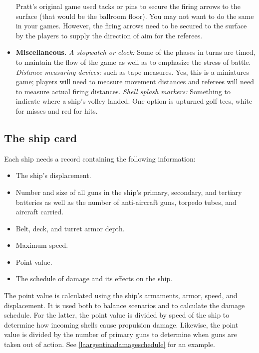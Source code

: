\documentclass[twocolumn]{article}
\begin{document}
\begin{itemize}
  Pratt's original game used tacks or pins to secure the firing arrows
  to the surface (that would be the ballroom floor). You may not want to
  do the same in your games. However, the firing arrows need to be secured to the
  surface by the players to supply the direction of aim for the referees.
\item \textbf{Miscellaneous.}
  \emph{A stopwatch or clock:} Some of the phases in turns are timed, to
  maintain the flow of the game as well as to emphasize the stress of
  battle.
  \emph{Distance measuring devices:} such as tape measures. Yes, this
  is a miniatures game; players will need to measure movement distances
  and referees will need to measure actual firing distances.
  \emph{Shell splash markers:} Something to indicate where a ship's
  volley landed. One option is upturned golf tees, white for misses and
  red for hits.
\end{itemize}

\subsection*{The ship card}

Each ship needs a record containing the following information:
\begin{itemize}
\item The ship's displacement.
\item Number and size of all guns in the ship's primary, secondary, and tertiary batteries as well as the number of anti-aircraft guns, torpedo tubes, and aircraft carried.
\item Belt, deck, and turret armor depth.
\item Maximum speed.
\item Point value.
\item The schedule of damage and its effects on the ship.
\end{itemize}

The point value is calculated using the ship's armaments, armor,
speed, and displacement. It is used both to balance scenarios and to
calculate the damage schedule. For the latter, the point value is
divided by speed of the ship to determine how incoming shells cause
propulsion damage. Likewise, the point value is divided by the number of
primary guns to determine when guns are taken out of action. See
\autoref{laargentinadamageschedule} for an example.
\end{document}
